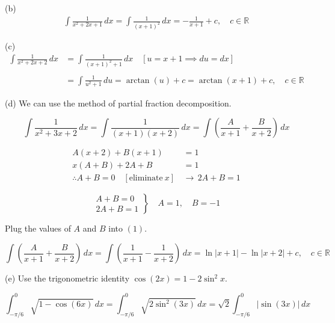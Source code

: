 \documentclass{article}
\begin{document}
\hfill

\noindent (b)
\begin{align*}\int\frac1{x^2+2x+1}\,dx=\int\frac1{(x+1)^2}\,dx=\boxed{-\frac1{x+1}+c, \quad c\in\mathbb{R}}\end{align*}

\hfill

\noindent (c)
\begin{align*}\int\frac1{x^2+2x+2}\,dx&=\int\frac1{(x+1)^2+1}\,dx\quad\left[u=x+1\implies du=dx\right]\\\\&=\int\frac1{u^2+1}\,du=\arctan(u)+c=\boxed{\arctan(x+1) +c,\quad c\in\mathbb{R}}\end{align*}

\hfill

\noindent (d) We can use the method of partial fraction decomposition.

\begin{equation}\int\frac1{x^2+3x+2}\,dx=\int\frac1{(x+1)(x+2)}\,dx=\int\left(\frac A{x+1}+\frac B{x+2}\right)\,dx\end{equation}

\begin{align*}
A(x+2)+B(x+1)&=1\\
x(A+B)+2A+B&=1\\
\therefore A+B=0\quad[\text{eliminate}\ x]\,&\rightarrow\,2A+B=1
\end{align*}

\[
\left.
\begin{array}{ll}
A+B=0\\
\displaystyle2A+B=1
\end{array}
\right\}
\quad A=1,\quad B=-1
\]

\hfill

\noindent Plug the values of $A$ and $B$ into $(1)$.

\begin{equation*}\int\left(\frac A{x+1}+\frac B{x+2}\right)\,dx=\int\left(\frac1{x+1}-\frac1{x+2}\right)\,dx=\boxed{\ln\left|x+1\right|-\ln\left|x+2\right|+c,\quad c\in\mathbb{R}}\end{equation*}

\hfill

\noindent (e) Use the trigonometric identity $\cos(2x)=1-2\sin^2x$.

\begin{equation*}\int_{-\pi/6}^0\sqrt{1-\cos(6x)}\,dx=\int_{-\pi/6}^0\sqrt{2\sin^2(3x)}\,dx=\sqrt2\int_{-\pi/6}^0\left|\sin(3x)\right|\,dx\end{equation*}
\end{document}
